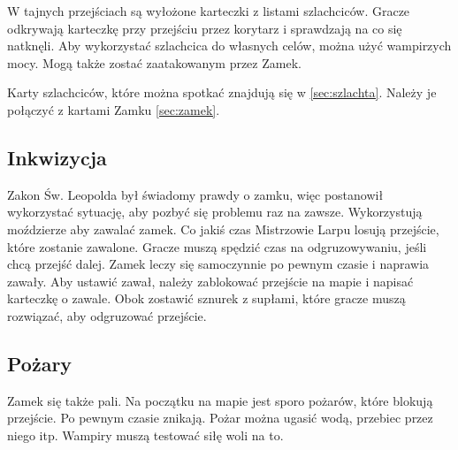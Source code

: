 		W tajnych przejściach są wyłożone karteczki z listami szlachciców.
		Gracze odkrywają karteczkę przy przejściu przez korytarz i sprawdzają na co się natknęli.
		Aby wykorzystać szlachcica do własnych celów, można użyć wampirzych mocy.
		Mogą także zostać zaatakowanym przez Zamek.
		
		Karty szlachciców, które można spotkać znajdują się w \ref{sec:szlachta}.
		Należy je połączyć z kartami Zamku \ref{sec:zamek}.
		
	\subsection{Inkwizycja}
		Zakon Św. Leopolda był świadomy prawdy o zamku, więc postanowił wykorzystać sytuację, aby pozbyć się problemu raz na zawsze.
		Wykorzystują moździerze aby zawalać zamek.
		Co jakiś czas Mistrzowie Larpu losują przejście, które zostanie zawalone.
		Gracze muszą spędzić czas na odgruzowywaniu, jeśli chcą przejść dalej.
		Zamek leczy się samoczynnie po pewnym czasie i naprawia zawały.
		Aby ustawić zawał, należy zablokować przejście na mapie i napisać karteczkę o zawale.
		Obok zostawić sznurek z supłami, które gracze muszą rozwiązać, aby odgruzować przejście.

	\subsection{Pożary}
		Zamek się także pali. Na początku na mapie jest sporo pożarów, które blokują przejście.
		Po pewnym czasie znikają.
		Pożar można ugasić wodą, przebiec przez niego itp.
		Wampiry muszą testować siłę woli na to.

